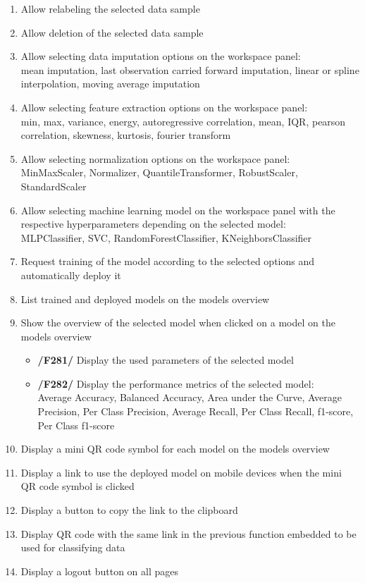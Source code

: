 \begin{enumerate}[{label = \textbf{/F{\protect\twodigits{\arabic{enumi}}}0/}, leftmargin = *}]
    \item Allow relabeling the selected data sample
    \item Allow deletion of the selected data sample
    \item Allow selecting data imputation options on the workspace panel: \\mean imputation, last observation carried forward imputation, linear or spline interpolation, moving average imputation
    \item Allow selecting feature extraction options on the workspace panel: \\min, max, variance, energy, autoregressive correlation, mean, IQR, pearson correlation, skewness, kurtosis, fourier transform
    \item Allow selecting normalization options on the workspace panel: \\MinMaxScaler, Normalizer, QuantileTransformer, RobustScaler, StandardScaler
    \item Allow selecting machine learning model on the workspace panel with the respective hyperparameters depending on the selected model: \\MLPClassifier, SVC, RandomForestClassifier, KNeighborsClassifier
    \item Request training of the model according to the selected options and automatically deploy it
    \item List trained and deployed models on the models overview
    \item Show the overview of the selected model when clicked on a model on the models overview
    \begin{itemize}
        \item \textbf{/F281/} Display the used parameters of the selected model
        \item \textbf{/F282/} Display the performance metrics of the selected model: \\Average Accuracy, Balanced Accuracy, Area under the Curve, Average Precision, Per Class Precision, Average Recall, Per Class Recall, f1-score, Per Class f1-score
    \end{itemize}
    \item Display a mini QR code symbol for each model on the models overview
    \item Display a link to use the deployed model on mobile devices when the mini QR code symbol is clicked
    \item Display a button to copy the link to the clipboard
    \item Display QR code with the same link in the previous function embedded to be used for classifying data
    \item Display a logout button on all pages
\end{enumerate}

